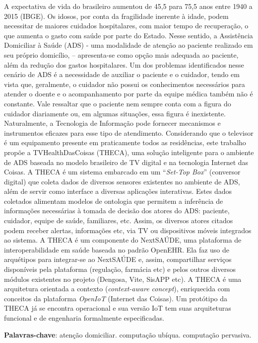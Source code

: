 \setlength{\absparsep}{18pt} %
\begin{resumo}

A expectativa de vida do brasileiro aumentou de 45,5 para 75,5 anos entre 1940 a
2015 (IBGE). Os idosos, por conta da fragilidade inerente à idade, podem
necessitar de maiores cuidados hospitalares, com maior tempo de recuperação, o
que aumenta o gasto com saúde por parte do Estado. Nesse sentido, a Assistência
Domiciliar à Saúde (ADS) - uma modalidade de atenção ao paciente realizado em
seu próprio domicílio, – apresenta-se como opção mais adequada ao paciente, além
da redução dos gastos hospitalares. Um dos problemas identificados nesse
cenário de ADS é a necessidade de auxiliar o paciente e o cuidador, tendo em
vista que, geralmente, o cuidador não possui os conhecimentos necessários para
atender o doente e o acompanhamento por parte da equipe médica também não é 
constante. Vale ressaltar que o paciente nem sempre conta com a figura do
cuidador diariamente ou, em algumas situações, essa figura é inexistente.
Naturalmente, a Tecnologia de Informação pode fornecer mecanismos e instrumentos
eficazes para esse tipo de atendimento. Considerando que o televisor é um
equipamento presente em praticamente todos as residências, este trabalho propõe
a TVHealthDasCoisas (THECA), uma solução inteligente para o ambiente de ADS
baseada no modelo brasileiro de TV digital e na tecnologia Internet das
Coisas. A THECA é um sistema embarcado em um ``\textit{Set-Top Box}'' (conversor
digital) que coleta dados de diversos sensores existentes no ambiente de ADS,
além de servir como interface a diversas aplicações interativas. Estes dados
coletados alimentam modelos de ontologia que permitem a inferência de
informações necessárias à tomada de decisão dos atores do ADS: paciente,
cuidador, equipe de saúde, familiares, etc. Assim, os diversos atores citados
podem receber alertas, informações etc, via TV ou dispositivos móveis integrados
ao sistema. A THECA é um componente do NextSAÚDE, uma plataforma de
interoperabilidade em saúde baseada no padrão OpenEHR. Ela faz uso de arquétipos
para integrar-se ao NextSAÚDE e, assim, compartilhar serviços disponíveis pela
plataforma (regulação, farmácia etc) e pelos outros diversos módulos existentes
no projeto (Dengosa, Vite, SisAPP etc). A THECA é uma arquitetura orientada a
contexto (\textit{context-aware concept}), enriquecida com conceitos da
plataforma \textit{OpenIoT} (Internet das Coisas). Um protótipo da THECA já se
encontra operacional e sua versão IoT tem suas arquiteturas funcional e de
engenharia formalmente especificadas.

 \textbf{Palavras-chave}: atenção domiciliar. computação ubíqua. computação pervasiva.
 \end{resumo}
